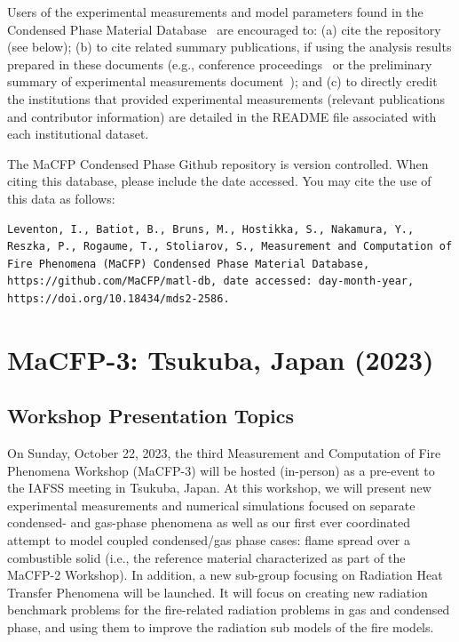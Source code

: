 \documentclass[12pt]{article}
\begin{document}
Users of the experimental measurements and model parameters found in the Condensed Phase Material Database~\cite{MaCFP-cond-db} are encouraged to: (a) cite the repository (see below); (b) to cite related summary publications, if using the analysis results prepared in these documents (e.g., conference proceedings~\cite{brown2018proceedings} or the preliminary summary of experimental measurements document~\cite{MaCFP-2_Prelim_Exp}); and (c) to directly credit the institutions that provided experimental measurements (relevant publications and contributor information) are detailed in the README file associated with each institutional dataset.

The MaCFP Condensed Phase Github repository is version controlled. When citing this database, please include the date accessed. You may cite the use of this data as follows:

\begin{lstlisting}
Leventon, I., Batiot, B., Bruns, M., Hostikka, S., Nakamura, Y., Reszka, P., Rogaume, T., Stoliarov, S., Measurement and Computation of Fire Phenomena (MaCFP) Condensed Phase Material Database, https://github.com/MaCFP/matl-db, date accessed: day-month-year, https://doi.org/10.18434/mds2-2586.
\end{lstlisting}

\clearpage
\section{MaCFP-3: Tsukuba, Japan (2023)}
\label{Sec:MaCFP-3}
\subsection{Workshop Presentation Topics}
\label{Sec:MaCFP-3 Target Cases}
On Sunday, October 22, 2023, the third Measurement and Computation of Fire Phenomena Workshop (MaCFP-3) will be hosted (in-person) as a pre-event to the IAFSS meeting in Tsukuba, Japan. At this workshop, we will present new experimental measurements and numerical simulations focused on separate condensed- and gas-phase phenomena as well as our first ever coordinated attempt to model coupled condensed/gas phase cases: flame spread over a combustible solid (i.e., the reference material characterized as part of the MaCFP-2 Workshop). In addition, a new sub-group focusing on Radiation Heat Transfer Phenomena will be launched. It will focus on creating new radiation benchmark problems for the fire-related radiation problems in gas and condensed phase, and using them to improve the radiation sub models of the fire models.\\
\end{document}
